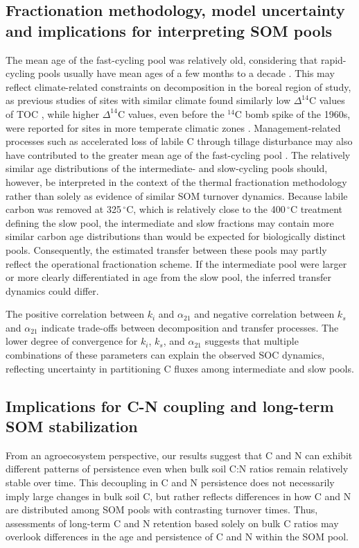 \documentclass[bg, manuscript]{copernicus}
\begin{document}
\subsection{Fractionation methodology, model uncertainty and implications for interpreting SOM pools}
The mean age of the fast-cycling pool was relatively old, considering that rapid-cycling pools usually have mean ages of a few months to a decade \citep{Trumbore2009}. This may reflect climate-related constraints on decomposition in the boreal region of study, as previous studies of sites with similar climate found similarly low $\Delta^{14}\text{C}$ values of TOC \citep{Spohn2023, Ellert2006}, while higher $\Delta^{14}\text{C}$ values, even before the $^{14}\text{C}$ bomb spike of the 1960s, were reported for sites in more temperate climatic zones \citep{Stoner2021, Baisden2013, Mills2014}. Management-related processes such as accelerated loss of labile C through tillage disturbance may also have contributed to the greater mean age of the fast-cycling pool \citep{Grandy2007}. The relatively similar age distributions of the intermediate- and slow-cycling pools should, however, be interpreted in the context of the thermal fractionation methodology rather than solely as evidence of similar SOM turnover dynamics. Because labile carbon was removed at 325\,$^\circ\text{C}$, which is relatively close to the 400\,$^\circ\text{C}$ treatment defining the slow pool, the intermediate and slow fractions may contain more similar carbon age distributions than would be expected for biologically distinct pools. Consequently, the estimated transfer between these pools may partly reflect the operational fractionation scheme. If the intermediate pool were larger or more clearly differentiated in age from the slow pool, the inferred transfer dynamics could differ.

The positive correlation between $k_i$ and $\alpha_{21}$ and negative correlation between $k_s$ and $\alpha_{21}$ indicate trade-offs between decomposition and transfer processes. The lower degree of convergence for $k_i$, $k_s$, and $\alpha_{21}$ suggests that multiple combinations of these parameters can explain the observed SOC dynamics, reflecting uncertainty in partitioning C fluxes among intermediate and slow pools.

\subsection{Implications for C-N coupling and long-term SOM stabilization}
From an agroecosystem perspective, our results suggest that C and N can exhibit different patterns of persistence even when bulk soil C:N ratios remain relatively stable over time. This decoupling in C and N persistence does not necessarily imply large changes in bulk soil C, but rather reflects differences in how C and N are distributed among SOM pools with contrasting turnover times. Thus, assessments of long-term C and N retention based solely on bulk C ratios may overlook differences in the age and persistence of C and N within the SOM pool.
\end{document}
